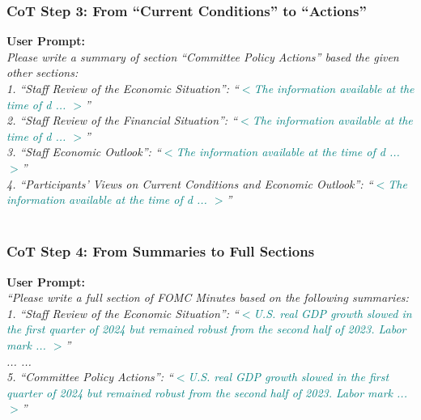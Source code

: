 \subsubsection*{CoT Step 3: From ``Current Conditions'' to ``Actions''}
\textbf{User Prompt:}\\
{\footnotesize
\textit{Please write a summary of  section ``Committee Policy Actions'' based the given other sections: \\
1. ``Staff Review of the Economic Situation'':  ``\textcolor{teal}{$<$The information available at the time of d ... $>$}''\\
2. ``Staff Review of the Financial Situation'': ``\textcolor{teal}{$<$The information available at the time of d ... $>$}''\\
3. ``Staff Economic Outlook'': ``\textcolor{teal}{$<$The information available at the time of d ... $>$}''\\
4. ``Participants' Views on Current Conditions and Economic Outlook'': ``\textcolor{teal}{$<$The information available at the time of d ... $>$}''\\
}} 
~\\
\subsubsection*{CoT Step 4: From Summaries to Full Sections}
\textbf{User Prompt:}\\
{\footnotesize
\textit{
``Please write a full section of FOMC Minutes based on the following summaries:\\
1. ``Staff Review of the Economic Situation'':  ``\textcolor{teal}{$<$U.S. real GDP growth slowed in the first quarter of 2024 but remained robust from the second half of 2023. Labor mark ... $>$}'' \\
... ...\\
5. ``Committee Policy Actions'': ``\textcolor{teal}{$<$U.S. real GDP growth slowed in the first quarter of 2024 but remained robust from the second half of 2023. Labor mark ... $>$}'' }
}








